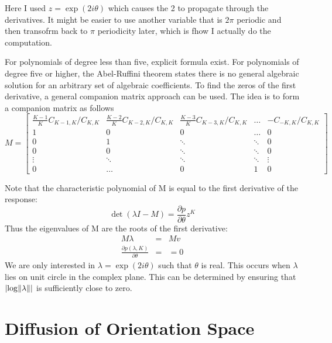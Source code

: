\documentclass{article}
\DeclarePairedDelimiter\abs{\lvert}{\rvert}%
\DeclarePairedDelimiter\norm{\lVert}{\rVert}%
\begin{document}
{\color{red} Here I used $ z = \exp(2i\theta) $ which causes the 2 to propagate through the derivatives. It might be easier to use another variable that is $ 2 \pi $ periodic and then transofrm back to $ \pi $ periodicity later, which is fhow I actually do the computation.}

For polynomials of degree less than five, explicit formula exist. For polynomials of degree five or higher, the Abel-Ruffini theorem states there is no general algebraic solution for an arbitrary set of algebraic coefficients.
To find the zeros of the first derivative, a general companion matrix approach can be used. The idea is to form a companion matrix as follows
\[
	M = \begin{bmatrix}
		\frac{K-1}{K} C_{K-1,K}/C_{K,K}  & \frac{K-2}{K} C_{K-2,K}/C_{K,K} & \frac{K-3}{K} C_{K-3,K}/C_{K,K} & \dots & -C_{-K,K}/C_{K,K} \\
		1                  & 0                 & 0                 & \dots & 0 \\
		0                  & 1                 & \ddots            & \ddots & 0 \\
		0                  & 0                 & \ddots            & \ddots & 0 \\
		\vdots             & \ddots            & \ddots            & \ddots& \vdots \\
		0                  & \dots                 & 0                 & 1     & 0 
	\end{bmatrix}
\]

Note that the characteristic polynomial of M is equal to the first derivative of the response:
\[ \det(\lambda I - M ) = \frac{\partial p}{\partial \theta} z^{K} \]
Thus the eigenvalues of M are the roots of the first derivative:
\begin{eqnarray}
	M \lambda & = & M v \\
	\frac{\partial p(\lambda,K)}{\partial \theta} & = & =0
\end{eqnarray}
We are only interested in $ \lambda = \exp(2i\theta) $ such that $ \theta $ is real. This occurs when $ \lambda $ lies on unit circle in the complex plane. This can be determined by ensuring that $ \abs{ \log \norm{\lambda} } $ is sufficiently close to zero.



\section{Diffusion of Orientation Space}
\end{document}
